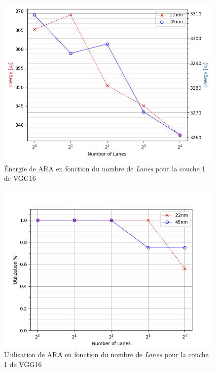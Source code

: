 \documentclass[11pt,letterpaper]{article}
\begin{document}
\begin{multicols}{2}
\begin{figure}[H]
        \includegraphics[width=\linewidth]{energy.png}
        \caption{Énergie de ARA en fonction du nombre de \textit{Lanes} pour la couche 1 de VGG16}
        \label{fig:energy}
    \end{figure}
    \begin{figure}[H]
        \centering
        \includegraphics[width=\linewidth]{utilization.png}
        \caption{Utilisation de ARA en fonction du nombre de \textit{Lanes} pour la couche 1 de VGG16}
        \label{fig:utilization}
    \end{figure}
    \begin{figure}[H]
        \centering

\end{figure}
\end{multicols}
\end{document}
